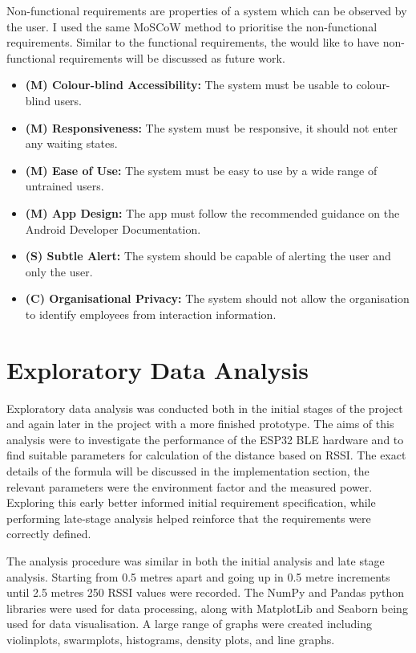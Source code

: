 \documentclass{l4proj}
\begin{document}
Non-functional requirements are properties of a system which can be observed by the user. I used the same MoSCoW method to prioritise the non-functional requirements. Similar to the functional requirements, the would like to have non-functional requirements will be discussed as future work.

\begin{itemize}
    \item \textbf{(M) Colour-blind Accessibility: } The system must be usable to colour-blind users.
    \item \textbf{(M) Responsiveness: } The system must be responsive, it should not enter any waiting states.
    \item \textbf{(M) Ease of Use: } The system must be easy to use by a wide range of untrained users.
    \item \textbf{(M) App Design: } The app must follow the recommended guidance on the Android Developer Documentation.
    \item \textbf{(S) Subtle Alert: } The system should be capable of alerting the user and only the user.
    \item \textbf{(C) Organisational Privacy: } The system should not allow the organisation to identify employees from interaction information.
\end{itemize}

\section{Exploratory Data Analysis}

Exploratory data analysis was conducted both in the initial stages of the project and again later in the project with a more finished prototype. The aims of this analysis were to investigate the performance of the ESP32 BLE hardware and to find suitable parameters for calculation of the distance based on RSSI. The exact details of the formula will be discussed in the implementation section, the relevant parameters were the environment factor and the measured power. Exploring this early better informed initial requirement specification, while performing late-stage analysis helped reinforce that the requirements were correctly defined.

The analysis procedure was similar in both the initial analysis and late stage analysis. Starting from 0.5 metres apart and going up in 0.5 metre increments until 2.5 metres 250 RSSI values were recorded. The NumPy and Pandas python libraries were used for data processing, along with MatplotLib and Seaborn being used for data visualisation. A large range of graphs were created including violinplots, swarmplots, histograms, density plots, and line graphs.
\end{document}
